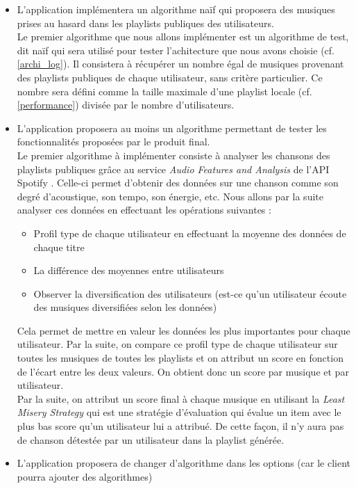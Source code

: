 \documentclass{article}
\begin{document}
		\begin{itemize}
			\item  L'application implémentera un algorithme naïf qui proposera des musiques prises au hasard dans les playlists publiques des utilisateurs.\newline \\
			      Le premier algorithme que nous allons implémenter est un algorithme de test, dit naïf qui sera utilisé pour tester l'achitecture que nous avons choisie (cf. \ref{archi_log}). Il consistera à récupérer un nombre égal de musiques provenant des playlists publiques de chaque utilisateur, sans critère particulier. Ce nombre sera défini comme la taille maximale d'une playlist locale (cf. \ref{performance}) divisée par le nombre d'utilisateurs.
			      		
		      \item  L'application proposera au moins un algorithme \cite{ICDM2017} permettant de tester les fonctionnalités proposées par le produit final.\newline \\
		            Le premier algorithme à implémenter consiste à analyser les chansons des playlists publiques grâce au service \textit{Audio Features and Analysis} de l'API Spotify \cite{spotify-web-api}. Celle-ci permet d'obtenir des données sur une chanson comme son degré d'acoustique, son tempo, son énergie, etc. Nous allons par la suite analyser ces données \cite{Data_analysis} en effectuant les opérations suivantes : 
		            \begin{itemize}
		                \item Profil type de chaque utilisateur en effectuant la moyenne des données de chaque titre
		                \item La différence des moyennes entre utilisateurs
		                \item Observer la diversification des utilisateurs (est-ce qu'un utilisateur écoute des musiques diversifiées selon les données) 
		            \end{itemize}
		            Cela permet de mettre en valeur les données les plus importantes pour chaque utilisateur. Par la suite, on compare ce profil type de chaque utilisateur sur toutes les musiques de toutes les playlists et on attribut un score en fonction de l'écart entre les deux valeurs.
		            On obtient donc un score par musique et par utilisateur. \\
		            Par la suite, on attribut un score final à chaque musique en utilisant la \textit{Least Misery Strategy} \cite{Masthof2011} qui est une stratégie d'évaluation qui évalue un item avec le plus bas score qu'un utilisateur lui a attribué. De cette façon, il n'y aura pas de chanson détestée par un utilisateur dans la playlist générée.
			      
			\item L'application proposera de changer d'algorithme dans les options (car le client pourra ajouter des algorithmes)
		\end{itemize} 
\end{document}

